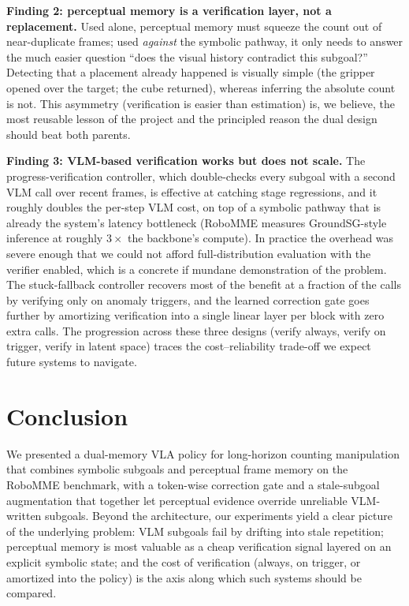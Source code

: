 \documentclass{article}
\begin{document}
\textbf{Finding 2: perceptual memory is a verification layer, not a replacement.} Used alone, perceptual memory must squeeze the count out of near-duplicate frames; used \emph{against} the symbolic pathway, it only needs to answer the much easier question ``does the visual history contradict this subgoal?'' Detecting that a placement already happened is visually simple (the gripper opened over the target; the cube returned), whereas inferring the absolute count is not. This asymmetry (verification is easier than estimation) is, we believe, the most reusable lesson of the project and the principled reason the dual design should beat both parents.

\textbf{Finding 3: VLM-based verification works but does not scale.} The progress-verification controller, which double-checks every subgoal with a second VLM call over recent frames, is effective at catching stage regressions, and it roughly doubles the per-step VLM cost, on top of a symbolic pathway that is already the system's latency bottleneck (RoboMME measures GroundSG-style inference at roughly $3\times$ the backbone's compute). In practice the overhead was severe enough that we could not afford full-distribution evaluation with the verifier enabled, which is a concrete if mundane demonstration of the problem. The stuck-fallback controller recovers most of the benefit at a fraction of the calls by verifying only on anomaly triggers, and the learned correction gate goes further by amortizing verification into a single linear layer per block with zero extra calls. The progression across these three designs (verify always, verify on trigger, verify in latent space) traces the cost--reliability trade-off we expect future systems to navigate.

\section{Conclusion}
\label{sec:conclusion}

We presented a dual-memory VLA policy for long-horizon counting manipulation that combines symbolic subgoals and perceptual frame memory on the RoboMME benchmark, with a token-wise correction gate and a stale-subgoal augmentation that together let perceptual evidence override unreliable VLM-written subgoals. Beyond the architecture, our experiments yield a clear picture of the underlying problem: VLM subgoals fail by drifting into stale repetition; perceptual memory is most valuable as a cheap verification signal layered on an explicit symbolic state; and the cost of verification (always, on trigger, or amortized into the policy) is the axis along which such systems should be compared.
\end{document}
